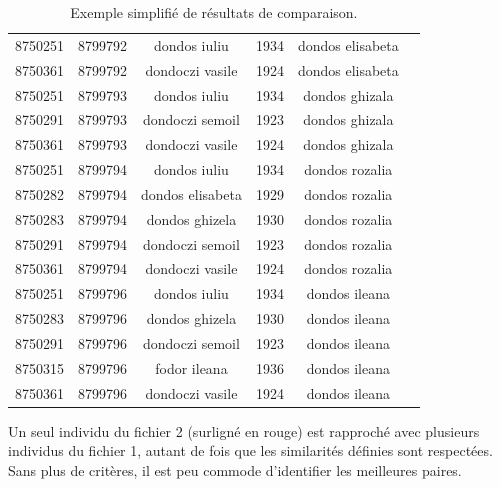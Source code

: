 \documentclass[a4paper,12pt,twoside]{book}
\begin{document}
\begin{table}[htbp]
\begin{tabular}{|c|c|c|c|c|c|}
                        8750251 & 8799792 & dondos iuliu & 1934 & dondos elisabeta &  \\
                        8750361 & 8799792 & dondoczi vasile & 1924 & dondos elisabeta &  \\
                        8750251 & 8799793 & dondos iuliu & 1934 & dondos ghizala &  \\
                        8750291 & 8799793 & dondoczi semoil & 1923 & dondos ghizala &  \\
                        8750361 & 8799793 & dondoczi vasile & 1924 & dondos ghizala &  \\
                        8750251 & 8799794 & dondos iuliu & 1934 & dondos rozalia &  \\
                        8750282 & 8799794 & dondos elisabeta & 1929 & dondos rozalia &  \\
                        8750283 & 8799794 & dondos ghizela & 1930 & dondos rozalia &  \\
                        8750291 & 8799794 & dondoczi semoil & 1923 & dondos rozalia &  \\
                        8750361 & 8799794 & dondoczi vasile & 1924 & dondos rozalia &  \\
                        8750251 & 8799796 & dondos iuliu & 1934 & dondos ileana &  \\
                        8750283 & 8799796 & dondos ghizela & 1930 & dondos ileana &  \\
                        8750291 & 8799796 & dondoczi semoil & 1923 & dondos ileana &  \\
                        8750315 & 8799796 & fodor ileana & 1936 & dondos ileana &  \\
                        8750361 & 8799796 & dondoczi vasile & 1924 & dondos ileana &  \\\hline
                    \end{tabular}
                \caption{Exemple simplifié de résultats de comparaison.}\label{tab12}
			    \end{table}   
                \vspace{-0.8em}
            
	            Un seul individu du fichier 2 (surligné en rouge) est rapproché avec plusieurs individus du fichier 1, autant de fois que les similarités définies sont respectées. Sans plus de critères, il est peu commode d'identifier les meilleures paires.
	            
\end{document}
